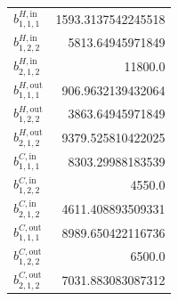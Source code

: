 \documentclass{article}%
\begin{document}
\begin{multicols*}{3}
\begin{supertabular}{lr}
	$b_{1,1,1}^{H,\text{in}}$ & 1593.3137542245518 \\%
	$b_{1,2,2}^{H,\text{in}}$ & 5813.64945971849 \\%
	$b_{2,1,2}^{H,\text{in}}$ & 11800.0 \\%
	$b_{1,1,1}^{H,\text{out}}$ & 906.9632139432064 \\%
	$b_{1,2,2}^{H,\text{out}}$ & 3863.64945971849 \\%
	$b_{2,1,2}^{H,\text{out}}$ & 9379.525810422025 \\%
	$b_{1,1,1}^{C,\text{in}}$ & 8303.29988183539 \\%
	$b_{1,2,2}^{C,\text{in}}$ & 4550.0 \\%
	$b_{2,1,2}^{C,\text{in}}$ & 4611.408893509331 \\%
	$b_{1,1,1}^{C,\text{out}}$ & 8989.650422116736 \\%
	$b_{1,2,2}^{C,\text{out}}$ & 6500.0 \\%
	$b_{2,1,2}^{C,\text{out}}$ & 7031.883083087312 \\%
\end{supertabular}%
\end{multicols*}%
\clearpage%
\end{document}
